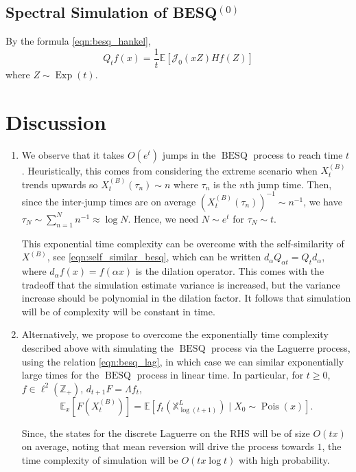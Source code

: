 \documentclass[11pt,a4,reqno]{amsart}
\numberwithin{equation}{section}
\theoremstyle{definition}
\theoremstyle{remark}
\newcommand{\bb}[1]{\mathbb{#1}}
\newcommand{\cl}[1]{\mathcal{#1}}
\newcommand{\E}{\bb{E}}
\newcommand{\Z}{\bb{Z}}
\DeclareMathOperator{\besq}{BESQ}
\DeclareMathOperator{\pois}{Pois}
\DeclareMathOperator{\Exp}{Exp}
\newcommand{\beq}{\begin{equation}}
\newcommand{\eeq}{\end{equation}}
\begin{document}
\subsection{Spectral Simulation of BESQ${}^{(0)}$}
	By the formula \eqref{eqn:besq_hankel}, 
		\beq Q_tf(x) = \frac{1}{t} \E[\cl{J}_0(xZ) Hf(Z)] \eeq
		where $Z \sim \Exp(t)$. 
	


	
\section{Discussion}

	\begin{enumerate}
		\item \label{bessel_self_similar} We observe that it takes $O(e^t)$ jumps in the $\besq$ process to reach time $t$. Heuristically, this comes from considering the extreme scenario when $X_t^{(B)}$ trends upwards so $X_t^{(B)}(\tau_n) \sim n$ where $\tau_n$ is the $n$th jump time. Then, since the inter-jump times are on average $(X_t^{(B)}(\tau_n))^{-1} \sim n^{-1}$, we have $\tau_N \sim \sum_{n = 1}^N n^{-1} \approx \log N$. Hence, we need $N \sim e^t$ for $\tau_N \sim t$. 
		
		This exponential time complexity can be overcome with the self-similarity of $X^{(B)}$, see \eqref{eqn:self_similar_besq}, which can be written $d_{\alpha} Q_{\alpha t} = Q_{t} d_\alpha$, where $d_\alpha f(x) = f(\alpha x)$ is the dilation operator. This comes with the tradeoff that the simulation estimate variance is increased, but the variance increase should be polynomial in the dilation factor. It follows that simulation will be of complexity will be constant in time. 
		
		\item \label{lag_connection} Alternatively, we propose to overcome the exponentially time complexity described above with simulating the $\besq$ process via the Laguerre process, using the relation \eqref{eqn:besq_lag}, in which case we can similar exponentially large times for the $\besq$ process in linear time. In particular, for $t \geq  0$, $f \in \ell^2(\Z_+)$, $d_{t + 1}F = \Lambda f_t$,
			\beq \E_x[F(X_t^{(B)})] = \E[f_t(\bb{X}^{L}_{\log (t + 1)}) \mid X_0 \sim \pois(x)] . \eeq
			
			Since, the states for the discrete Laguerre on the RHS will be of size $O(tx)$ on average, noting that mean reversion will drive the process towards $1$, the time complexity of simulation will be $O(tx \log t)$ with high probability. 
		
			
		

	\end{enumerate}
	



\end{document}
